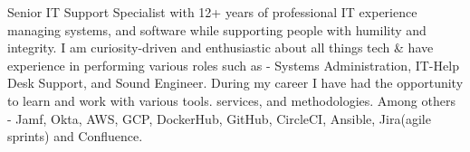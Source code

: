 

\begin{cvparagraph}

	Senior IT Support Specialist with 12+ years of professional IT experience managing systems, and software while supporting people with humility and integrity. I am curiosity-driven and enthusiastic about all things tech \& have experience in performing various roles such as - Systems Administration, IT-Help Desk Support, and Sound Engineer. During my career I have had the opportunity to learn and work with various tools. services, and methodologies. Among others - Jamf, Okta, AWS, GCP, DockerHub, GitHub, CircleCI, Ansible, Jira(agile sprints) and Confluence.
\end{cvparagraph}
